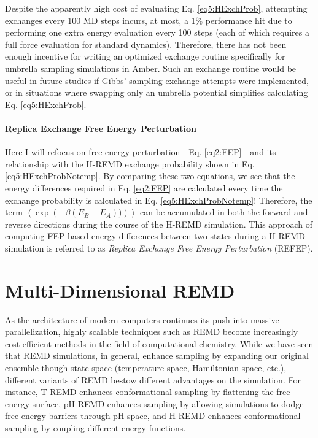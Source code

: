 Despite the apparently high cost of evaluating Eq. \ref{eq5:HExchProb},
attempting exchanges every 100 MD steps incurs, at most, a 1\% performance hit
due to performing one extra energy evaluation every 100 steps (each of which
requires a full force evaluation for standard dynamics). Therefore, there has
not been enough incentive for writing an optimized exchange routine specifically
for umbrella sampling simulations in Amber. Such an exchange routine would be
useful in future studies if Gibbs' sampling exchange attempts were implemented,
\cite{Chodera_JChemPhys_2011_v135_p194110} or in situations where swapping only
an umbrella potential simplifies calculating Eq. \ref{eq5:HExchProb}.

\paragraph{Replica Exchange Free Energy Perturbation}

Here I will refocus on free energy perturbation---Eq.  \ref{eq2:FEP}---and its
relationship with the H-REMD exchange probability shown in Eq.
\ref{eq5:HExchProbNotemp}. By comparing these two equations, we see that the
energy differences required in Eq. \ref{eq2:FEP} are calculated every time the
exchange probability is calculated in Eq. \ref{eq5:HExchProbNotemp}!  Therefore,
the term $\left\langle\exp\left(-\beta(E_B-E_A))\right)\right\rangle$ can be
accumulated in both the forward and reverse directions during the course of the
H-REMD simulation. This approach of computing FEP-based energy differences
between two states during a H-REMD simulation is referred to as \emph{Replica
Exchange Free Energy Perturbation} (REFEP).
\cite{Meng_JChemTheoryComput_2011_v7_p2721,
Jiang_JChemTheoryComput_2010_v6_p2559}

\section{Multi-Dimensional REMD}

As the architecture of modern computers continues its push into massive
parallelization, highly scalable techniques such as REMD become increasingly
cost-efficient methods in the field of computational chemistry. While we have
seen that REMD simulations, in general, enhance sampling by expanding our
original ensemble though state space (\eg temperature space, Hamiltonian space,
etc.), different variants of REMD bestow different advantages on the simulation.
For instance, T-REMD enhances conformational sampling by flattening the free
energy surface, pH-REMD enhances sampling by allowing simulations to dodge free
energy barriers through pH-space, and H-REMD enhances conformational sampling by
coupling different energy functions.

